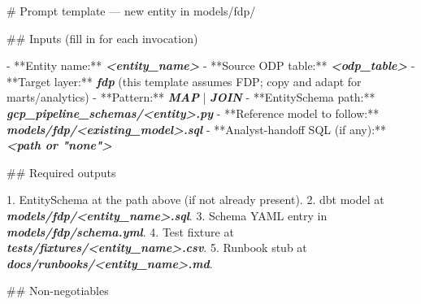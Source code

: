 \documentclass[
  11pt,
  british,
  oneside]{book}
\newenvironment{Shaded}{\begin{snugshade}}{\end{snugshade}}
\newcommand{\FunctionTok}[1]{\textcolor[rgb]{0.00,0.00,0.00}{#1}}
\newcommand{\InformationTok}[1]{\textcolor[rgb]{0.56,0.35,0.01}{\textbf{\textit{#1}}}}
\newcommand{\NormalTok}[1]{#1}
\newcommand{\SpecialStringTok}[1]{\textcolor[rgb]{0.31,0.60,0.02}{#1}}
\begin{document}
\begin{Shaded}
\begin{Highlighting}[]
\FunctionTok{\# Prompt template — new entity in \textasciigrave{}models/fdp/\textasciigrave{}}

\FunctionTok{\#\# Inputs (fill in for each invocation)}

\SpecialStringTok{{-} }\NormalTok{**Entity name:** }\InformationTok{\textasciigrave{}\textless{}entity\_name\textgreater{}\textasciigrave{}}
\SpecialStringTok{{-} }\NormalTok{**Source ODP table:** }\InformationTok{\textasciigrave{}\textless{}odp\_table\textgreater{}\textasciigrave{}}
\SpecialStringTok{{-} }\NormalTok{**Target layer:** }\InformationTok{\textasciigrave{}fdp\textasciigrave{}}\NormalTok{ (this template assumes FDP; copy and}
\NormalTok{  adapt for marts/analytics)}
\SpecialStringTok{{-} }\NormalTok{**Pattern:** }\InformationTok{\textasciigrave{}MAP\textasciigrave{}}\NormalTok{ | }\InformationTok{\textasciigrave{}JOIN\textasciigrave{}}
\SpecialStringTok{{-} }\NormalTok{**EntitySchema path:** }\InformationTok{\textasciigrave{}gcp\_pipeline\_schemas/\textless{}entity\textgreater{}.py\textasciigrave{}}
\SpecialStringTok{{-} }\NormalTok{**Reference model to follow:** }\InformationTok{\textasciigrave{}models/fdp/\textless{}existing\_model\textgreater{}.sql\textasciigrave{}}
\SpecialStringTok{{-} }\NormalTok{**Analyst{-}handoff SQL (if any):** }\InformationTok{\textasciigrave{}\textless{}path or "none"\textgreater{}\textasciigrave{}}

\FunctionTok{\#\# Required outputs}

\SpecialStringTok{1. }\NormalTok{EntitySchema at the path above (if not already present).}
\SpecialStringTok{2. }\NormalTok{dbt model at }\InformationTok{\textasciigrave{}models/fdp/\textless{}entity\_name\textgreater{}.sql\textasciigrave{}}\NormalTok{.}
\SpecialStringTok{3. }\NormalTok{Schema YAML entry in }\InformationTok{\textasciigrave{}models/fdp/schema.yml\textasciigrave{}}\NormalTok{.}
\SpecialStringTok{4. }\NormalTok{Test fixture at }\InformationTok{\textasciigrave{}tests/fixtures/\textless{}entity\_name\textgreater{}.csv\textasciigrave{}}\NormalTok{.}
\SpecialStringTok{5. }\NormalTok{Runbook stub at }\InformationTok{\textasciigrave{}docs/runbooks/\textless{}entity\_name\textgreater{}.md\textasciigrave{}}\NormalTok{.}

\FunctionTok{\#\# Non{-}negotiables}


\end{Highlighting}
\end{Shaded}
\end{document}
